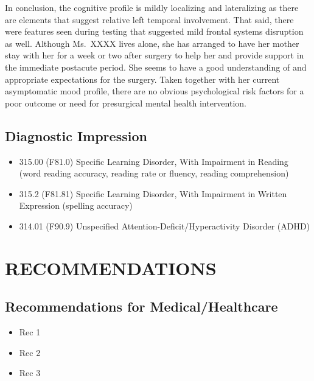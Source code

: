 \documentclass[
  letterpaper,
  DIV=11,
  numbers=noendperiod,
  oneside]{scrartcl}
\providecommand{\tightlist}{%
  \setlength{\itemsep}{0pt}\setlength{\parskip}{0pt}}\usepackage{longtable,booktabs,array}
\begin{document}
In conclusion, the cognitive profile is mildly localizing and
lateralizing as there are elements that suggest relative left temporal
involvement. That said, there were features seen during testing that
suggested mild frontal systems disruption as well. Although Ms.~XXXX
lives alone, she has arranged to have her mother stay with her for a
week or two after surgery to help her and provide support in the
immediate postacute period. She seems to have a good understanding of
and appropriate expectations for the surgery. Taken together with her
current asymptomatic mood profile, there are no obvious psychological
risk factors for a poor outcome or need for presurgical mental health
intervention.

\hypertarget{diagnostic-impression}{%
\subsection{Diagnostic Impression}\label{diagnostic-impression}}

\begin{itemize}
\tightlist
\item
  315.00 (F81.0) Specific Learning Disorder, With Impairment in Reading
  (word reading accuracy, reading rate or fluency, reading
  comprehension)
\item
  315.2 (F81.81) Specific Learning Disorder, With Impairment in Written
  Expression (spelling accuracy)
\item
  314.01 (F90.9) Unspecified Attention-Deficit/Hyperactivity Disorder
  (ADHD)
\end{itemize}

\hypertarget{recommendations}{%
\section{RECOMMENDATIONS}\label{recommendations}}

\hypertarget{recommendations-for-medicalhealthcare}{%
\subsection{Recommendations for
Medical/Healthcare}\label{recommendations-for-medicalhealthcare}}

\begin{itemize}
\tightlist
\item
  Rec 1
\item
  Rec 2
\item
  Rec 3
\end{itemize}
\end{document}
